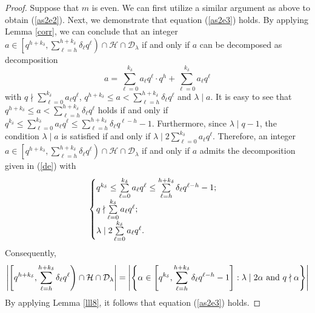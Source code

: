 \documentclass[journal,onecolumn]{IEEEtran}
\begin{document}
\begin{proof}
Suppose that $m$ is even. We can first utilize a similar argument as above to obtain (\ref{as2e2}).  Next, we demonstrate that equation (\ref{as2e3}) holds. By applying Lemma \ref{corr}, we can conclude that an integer $a\in \left[q^{h+k_{\delta}}, \sum\limits_{\ell=h}^{h+k_{\delta}}
        \delta_{\ell}q^{\ell}\right)\cap  \mathcal{H} \cap \mathcal{D}_{\lambda}$ if and only if $a$ can be decomposed as  decomposition 
        \begin{equation}\label{de}
a=\sum\limits_{\ell=0}^{k_{\delta}}a_{\ell}q^{\ell}\cdot q^{h}+\sum\limits_{\ell=0}^{k_{\delta}}a_{\ell}q^{\ell}
        \end{equation}
        with 
        $q\nmid \sum\limits_{\ell=0}^{k_{\delta}}a_{\ell}q^{\ell}$, $q^{h+k_{\delta}}\leq a<\sum\limits_{\ell=h}^{h+k_{\delta}}\delta_{\ell}q^{\ell}$ and $\lambda\mid a$.  
        It is easy to see that  $q^{h+k_{\delta}}\leq a <\sum\limits_{\ell=h}^{h+k_{\delta}}\delta_{\ell}q^{\ell}$ holds if and only if 
$q^{k_{\delta}}\leq \sum\limits_{\ell=0}^{k_{\delta}}a_{\ell}q^{\ell}\leq \sum\limits_{\ell=h}^{h+k_{\delta}}\delta_{\ell}q^{\ell-h}-1$. Furthermore, 
  since $\lambda\mid q-1$,  the condition $\lambda\mid a $ is satisfied if and only if $\lambda\mid 2\sum\limits_{\ell=0}^{k_{\delta}}a_{\ell}q^{\ell}$.   Therefore,      an integer $a\in \left[q^{h+k_{\delta}}, \sum\limits_{\ell=h}^{h+k_{\delta}}
        \delta_{\ell}q^{\ell}\right)\cap  \mathcal{H} \cap \mathcal{D}_{\lambda}$ if and only if $a$ admits  the decomposition given in (\ref{de})
with 
\begin{equation}\notag
    \begin{cases}
    q^{k_{\delta}}\leq \sum\limits_{\ell=0}^{k_{\delta}}a_{\ell}q^{\ell}\leq \sum\limits_{\ell=h}^{h+k_{\delta}}\delta_{\ell}q^{\ell-h}-1;\\
        q\nmid \sum\limits_{\ell=0}^{k_{\delta}}a_{\ell}q^{\ell};\\
        \lambda\mid 2\sum\limits_{\ell=0}^{k_{\delta}}a_{\ell}q^{\ell}.
    \end{cases}
\end{equation}
 Consequently, 
\begin{equation}\notag
\begin{split}
   \left|\left[q^{h+k_{\delta}}, \sum\limits_{\ell=h}^{h+k_{\delta}}
        \delta_{\ell}q^{\ell}\right)\cap  \mathcal{H} \cap \mathcal{D}_{\lambda}\right| = \left|\left \{\alpha \in \left[q^{k_{\delta}}, \sum\limits_{\ell=h}^{h+k_{\delta}}\delta_{\ell}q^{\ell-h}-1\right]: \lambda \mid 2\alpha \hbox{ and }  q \nmid \alpha   \right\}\right|
        \end{split}
\end{equation}
By applying Lemma \ref{lll8}, it follows that equation (\ref{as2e3}) holds. 
\end{proof}
\end{document}
